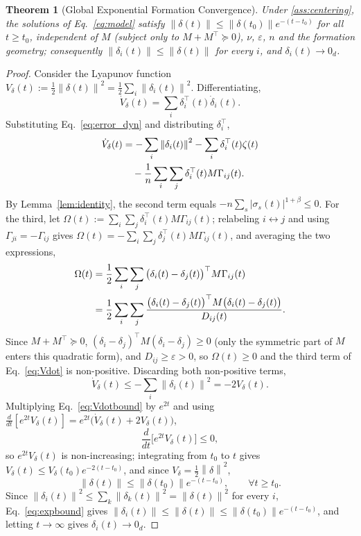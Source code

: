 \documentclass[letterpaper, 10 pt, conference]{ieeeconf}
\newcommand{\norm}[1]{\left\lVert #1 \right\rVert}
\newtheorem{theorem}{Theorem}
\begin{document}
\begin{theorem}[Global Exponential Formation Convergence]
\label{thm:formation}
Under \cref{ass:centering}, the solutions of Eq.~\eqref{eq:model} satisfy
$\norm{\delta(t)}\le\norm{\delta(t_0)}e^{-(t-t_0)}$ for all $t\ge t_0$,
independent of $M$ (subject only to $M+M^\top\succeq0$), $\nu$, $\varepsilon$, $n$ and the formation geometry; consequently
$\norm{\delta_i(t)}\le\norm{\delta(t)}$ for every $i$, and
$\delta_i(t)\to0_d$.
\end{theorem}
\begin{proof}
Consider the Lyapunov function
$V_\delta(t):=\frac12\norm{\delta(t)}^2=\frac12\sum_i\norm{\delta_i(t)}^2$.
Differentiating,
\[
\dot V_\delta(t) = \sum_i\delta_i^\top(t)\dot\delta_i(t).
\]
Substituting Eq.~\eqref{eq:error_dyn} and distributing $\delta_i^\top$,
\begin{align}
\dot V_\delta(t) &= -\sum_i\norm{\delta_i(t)}^2 -\sum_i\delta_i^\top(t)\zeta(t)
\notag\\
&\quad -\frac1n\sum_i\sum_j\delta_i^\top(t)M\Gamma_{ij}(t).
\label{eq:Vdot}
\end{align}
By Lemma~\ref{lem:identity}, the second term equals
$-n\sum_s|\sigma_s(t)|^{1+\beta}\le0$. For the third, let
$\Omega(t):=\sum_i\sum_j\delta_i^\top(t)M\Gamma_{ij}(t)$; relabeling
$i\leftrightarrow j$ and using $\Gamma_{ji}=-\Gamma_{ij}$ gives
$\Omega(t)=-\sum_i\sum_j\delta_j^\top(t)M\Gamma_{ij}(t)$, and averaging
the two expressions,
\begin{align}
\Omega(t) &= \frac12\sum_i\sum_j\big(\delta_i(t)-\delta_j(t)\big)^\top M\Gamma_{ij}(t)
\notag\\
&= \frac12\sum_i\sum_j\frac{\big(\delta_i(t)-\delta_j(t)\big)^\top M\big(\delta_i(t)-\delta_j(t)\big)}{D_{ij}(t)}.
\label{eq:Omega}
\end{align}
Since $M+M^\top\succeq0$, $(\delta_i-\delta_j)^\top M(\delta_i-\delta_j)\ge0$
(only the symmetric part of $M$ enters this quadratic form), and
$D_{ij}\ge\varepsilon>0$, so $\Omega(t)\ge0$ and the third term of
Eq.~\eqref{eq:Vdot} is non-positive. Discarding both non-positive terms,
\begin{equation}
\dot V_\delta(t) \le -\sum_i\norm{\delta_i(t)}^2 = -2V_\delta(t).
\label{eq:Vdotbound}
\end{equation}
Multiplying Eq.~\eqref{eq:Vdotbound} by $e^{2t}$ and using
$\frac{d}{dt}[e^{2t}V_\delta(t)] = e^{2t}\big(\dot V_\delta(t)+2V_\delta(t)\big)$,
\[
\frac{d}{dt}\big[e^{2t}V_\delta(t)\big] \le 0,
\]
so $e^{2t}V_\delta(t)$ is non-increasing; integrating from $t_0$ to
$t$ gives $V_\delta(t)\le V_\delta(t_0)e^{-2(t-t_0)}$, and since
$V_\delta=\frac12\norm{\delta}^2$,
\begin{equation}
\norm{\delta(t)}\le\norm{\delta(t_0)}e^{-(t-t_0)}, \qquad \forall t\ge t_0.
\label{eq:expbound}
\end{equation}
Since $\norm{\delta_i(t)}^2\le\sum_k\norm{\delta_k(t)}^2=\norm{\delta(t)}^2$
for every $i$, Eq.~\eqref{eq:expbound} gives
$\norm{\delta_i(t)}\le\norm{\delta(t)}\le\norm{\delta(t_0)}e^{-(t-t_0)}$,
and letting $t\to\infty$ gives $\delta_i(t)\to0_d$.
\end{proof}
\end{document}
